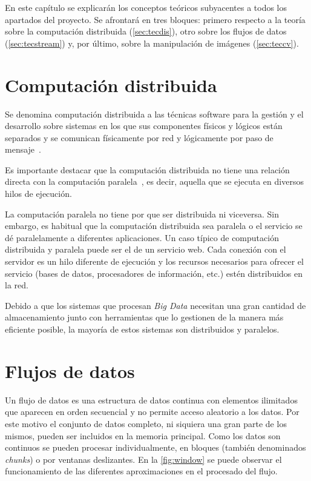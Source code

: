 

En este capítulo se explicarán los conceptos teóricos subyacentes a todos los apartados del proyecto. Se afrontará en tres bloques: primero respecto a la teoría sobre la computación distribuida (\autoref{sec:tecdis}), otro sobre los flujos de datos (\autoref{sec:tecstream}) y,  por último, sobre la manipulación de imágenes (\autoref{sec:teccv}).

\section{Computación distribuida}\label{sec:tecdis}

Se denomina computación distribuida a las técnicas software para la gestión y el desarrollo sobre sistemas en los que sus componentes físicos y lógicos están separados y se comunican físicamente por red y lógicamente por paso de mensaje~\cite{wiki:computaciondistribuida}.

Es importante destacar que la computación distribuida no tiene una relación directa con la computación paralela~\cite{christos1994computational}, es decir, aquella que se ejecuta en diversos hilos de ejecución. 

La computación paralela no tiene por que ser distribuida ni viceversa. Sin embargo, es habitual que la computación distribuida sea paralela o el servicio se dé paralelamente a diferentes aplicaciones. Un caso típico de computación distribuida y paralela puede ser el de un servicio web. Cada conexión con el servidor es un hilo diferente de ejecución y los recursos necesarios para ofrecer el servicio (bases de datos, procesadores de información, etc.) estén distribuidos en la red.

Debido a que los sistemas que procesan \textit{Big Data} necesitan una gran cantidad de almacenamiento junto con herramientas que lo gestionen de la manera más eficiente posible, la mayoría de estos sistemas son distribuidos y paralelos.


\section{Flujos de datos}\label{sec:tecstream}

Un flujo de datos es una estructura de datos continua con elementos ilimitados que aparecen en orden secuencial y no permite acceso aleatorio a los datos. Por este motivo el conjunto de datos completo, ni siquiera una gran parte de los mismos, pueden ser incluidos en la memoria principal. Como los datos son continuos se pueden procesar individualmente, en bloques (también denominados \textit{chunks}) o por ventanas deslizantes. En la \autoref{fig:window} se puede observar el funcionamiento de las diferentes aproximaciones en el procesado del flujo.

